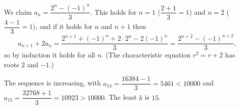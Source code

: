 We claim $a_n=\dfrac{2^n-(-1)^n}{3}$. This holds for $n=1$ ($\dfrac{2+1}{3}=1$) and $n=2$ ($\dfrac{4-1}{3}=1$), and if it holds for $n$ and $n+1$ then
\[a_{n+1}+2a_n=\dfrac{2^{n+1}+(-1)^{n}+2\cdot2^n-2(-1)^n}{3}=\dfrac{2^{n+2}-(-1)^{n+2}}{3},\]
so by induction it holds for all $n$. (The characteristic equation $r^2=r+2$ has roots $2$ and $-1$.)

The sequence is increasing, with $a_{14}=\dfrac{16384-1}{3}=5461<10000$ and $a_{15}=\dfrac{32768+1}{3}=10923>10000$. The least $k$ is $\boxed{15}$.
